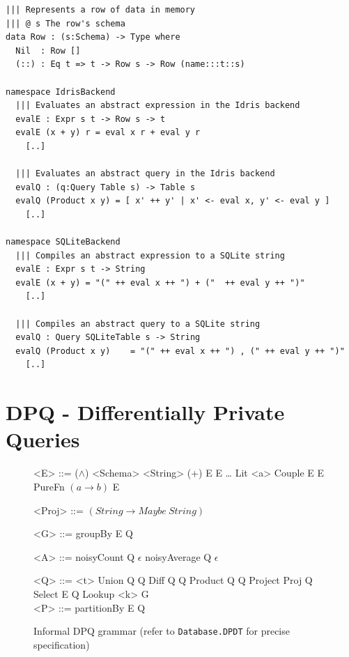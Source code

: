 \documentclass[12pt]{report}
\begin{document}
\begin{lstlisting}[caption={Implementing backends (snippets)},label={lst:idris_backend}]
||| Represents a row of data in memory
||| @ s The row's schema
data Row : (s:Schema) -> Type where
  Nil  : Row []
  (::) : Eq t => t -> Row s -> Row (name:::t::s)

namespace IdrisBackend
  ||| Evaluates an abstract expression in the Idris backend
  evalE : Expr s t -> Row s -> t
  evalE (x + y) r = eval x r + eval y r
    [..]

  ||| Evaluates an abstract query in the Idris backend
  evalQ : (q:Query Table s) -> Table s
  evalQ (Product x y) = [ x' ++ y' | x' <- eval x, y' <- eval y ]
    [..]

namespace SQLiteBackend
  ||| Compiles an abstract expression to a SQLite string
  evalE : Expr s t -> String
  evalE (x + y) = "(" ++ eval x ++ ") + ("  ++ eval y ++ ")"
    [..]

  ||| Compiles an abstract query to a SQLite string
  evalQ : Query SQLiteTable s -> String
  evalQ (Product x y)    = "(" ++ eval x ++ ") , (" ++ eval y ++ ")"
    [..]
\end{lstlisting}

\chapter{DPQ - Differentially Private Queries}\label{sec:DPQ}

\begin{figure}[H]
\begin{mdframed}
\begin{minipage}[t]{0.5\textwidth}
  \begin{grammar}
    <E> ::= \phantom
    \alt ($\land$) <Schema> <String>
    \alt (+) E E
    \alt \ldots
    \alt Lit <a>
    \alt Couple E E
    \alt PureFn $(a \rightarrow b)$ E

    <Proj> ::= $(String \rightarrow Maybe\ String)$

    <G> ::= \phantom
    \alt groupBy E Q

    <A> ::= \phantom
    \alt noisyCount Q $\epsilon$
    \alt noisyAverage Q $\epsilon$
  \end{grammar}
\end{minipage} %
\begin{minipage}[t]{0.5\textwidth}
  \begin{grammar}
    <Q> ::= \phantom
    \alt <t>
    \alt Union Q Q
    \alt Diff Q Q
    \alt Product Q Q
    \alt Project Proj Q
    \alt Select E Q
    \alt Lookup <k> G
    \\

    <P> ::= \phantom
    \alt partitionBy E Q
  \end{grammar}
\end{minipage}
\end{mdframed}
\caption{Informal DPQ grammar (refer to \texttt{Database.DPDT} for precise specification)}
\label{gram:radt}
\end{figure}
\end{document}
